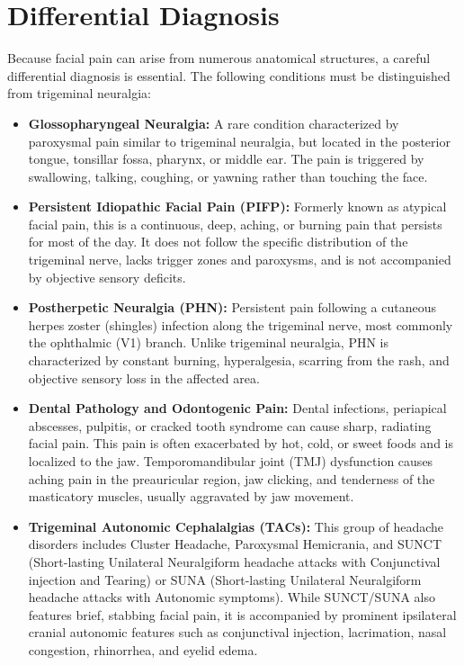 \section*{Differential Diagnosis}
Because facial pain can arise from numerous anatomical structures, a careful differential diagnosis is essential. The following conditions must be distinguished from trigeminal neuralgia:
\begin{itemize}
  \item \textbf{Glossopharyngeal Neuralgia:} A rare condition characterized by paroxysmal pain similar to trigeminal neuralgia, but located in the posterior tongue, tonsillar fossa, pharynx, or middle ear. The pain is triggered by swallowing, talking, coughing, or yawning rather than touching the face.
  \item \textbf{Persistent Idiopathic Facial Pain (PIFP):} Formerly known as atypical facial pain, this is a continuous, deep, aching, or burning pain that persists for most of the day. It does not follow the specific distribution of the trigeminal nerve, lacks trigger zones and paroxysms, and is not accompanied by objective sensory deficits.
  \item \textbf{Postherpetic Neuralgia (PHN):} Persistent pain following a cutaneous herpes zoster (shingles) infection along the trigeminal nerve, most commonly the ophthalmic (V1) branch. Unlike trigeminal neuralgia, PHN is characterized by constant burning, hyperalgesia, scarring from the rash, and objective sensory loss in the affected area.
  \item \textbf{Dental Pathology and Odontogenic Pain:} Dental infections, periapical abscesses, pulpitis, or cracked tooth syndrome can cause sharp, radiating facial pain. This pain is often exacerbated by hot, cold, or sweet foods and is localized to the jaw. Temporomandibular joint (TMJ) dysfunction causes aching pain in the preauricular region, jaw clicking, and tenderness of the masticatory muscles, usually aggravated by jaw movement.
  \item \textbf{Trigeminal Autonomic Cephalalgias (TACs):} This group of headache disorders includes Cluster Headache, Paroxysmal Hemicrania, and SUNCT (Short-lasting Unilateral Neuralgiform headache attacks with Conjunctival injection and Tearing) or SUNA (Short-lasting Unilateral Neuralgiform headache attacks with Autonomic symptoms). While SUNCT/SUNA also features brief, stabbing facial pain, it is accompanied by prominent ipsilateral cranial autonomic features such as conjunctival injection, lacrimation, nasal congestion, rhinorrhea, and eyelid edema.

\end{itemize}
